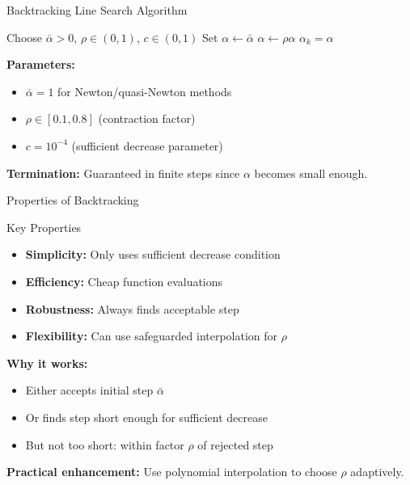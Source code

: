 \documentclass[aspectratio=1610]{beamer}
\begin{document}
 \begin{frame}{Backtracking Line Search Algorithm}
  \begin{algorithm}[H]
    \caption{Backtracking Line Search}
    \begin{algorithmic}[1]
      \Require Choose $\bar{\alpha} > 0$, $\rho \in (0,1)$, $c \in (0,1)$
      \State Set $\alpha \leftarrow \bar{\alpha}$
        \State $\alpha \leftarrow \rho \alpha$
      \EndWhile
      \State \Return $\alpha_k = \alpha$
    \end{algorithmic}
  \end{algorithm}

  \vspace{0.3cm}
  
  \textbf{Parameters:}
  \begin{itemize}
    \item $\bar{\alpha} = 1$ for Newton/quasi-Newton methods
    \item $\rho \in [0.1, 0.8]$ (contraction factor)
    \item $c = 10^{-4}$ (sufficient decrease parameter)
  \end{itemize}
  
  \vspace{0.3cm}
  
  \textbf{Termination:} Guaranteed in finite steps since $\alpha$ becomes small enough.
\end{frame}

\begin{frame}{Properties of Backtracking}
  \begin{block}{Key Properties}
    \begin{itemize}
      \item \textbf{Simplicity:} Only uses sufficient decrease condition
      \item \textbf{Efficiency:} Cheap function evaluations
      \item \textbf{Robustness:} Always finds acceptable step
      \item \textbf{Flexibility:} Can use safeguarded interpolation for $\rho$
    \end{itemize}
  \end{block}
  
  \vspace{0.3cm}
  
  \textbf{Why it works:}
  \begin{itemize}
    \item Either accepts initial step $\bar{\alpha}$ 
    \item Or finds step short enough for sufficient decrease
    \item But not too short: within factor $\rho$ of rejected step
  \end{itemize}
  
  \vspace{0.3cm}
  
  \textbf{Practical enhancement:} Use polynomial interpolation to choose $\rho$ adaptively.
\end{frame}
\end{document}
